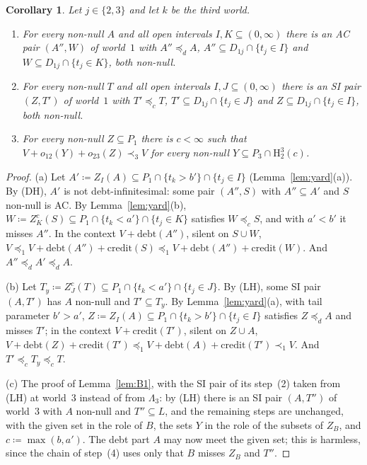 \documentclass[11pt]{article}
\newtheorem{corollary}[theorem]{Corollary}
\theoremstyle{definition}\newtheorem{definition}[theorem]{Definition}
\theoremstyle{remark}\newtheorem{remark}[theorem]{Remark}
\newcommand{\debt}{\mathrm{debt}}
\newcommand{\cred}{\mathrm{credit}}
\newcommand{\Hi}[3]{\mathrm H^{#1}_{#2}(#3)}
\begin{document}
\begin{corollary}\label{cor:LHcons}
Let $j\in\{2,3\}$ and let $k$ be the third world.
\begin{enumerate}[label=(\alph*)]
\item For every non-null $A$ and all open intervals $I,K\subseteq(0,\infty)$
there is an AC pair $(A'',W)$ of world~$1$ with $A''\preceq_dA$,
$A''\subseteq D_{1j}\cap\{t_j\in I\}$ and $W\subseteq D_{1j}\cap\{t_j\in K\}$,
both non-null.
\item For every non-null $T$ and all open intervals $I,J\subseteq(0,\infty)$
there is an SI pair $(Z,T')$ of world~$1$ with $T'\preceq_cT$,
$T'\subseteq D_{1j}\cap\{t_j\in J\}$ and $Z\subseteq D_{1j}\cap\{t_j\in I\}$,
both non-null.
\item For every non-null $Z\subseteq P_1$ there is $c<\infty$ such that
$V+o_{12}(Y)+o_{23}(Z)\prec_3V$ for every non-null $Y\subseteq P_3\cap
\Hi32c$.
\end{enumerate}
\end{corollary}
\begin{proof}
(a) Let $A'\coloneqq Z_I(A)\subseteq P_1\cap\{t_k>b'\}\cap\{t_j\in I\}$
(Lemma~\ref{lem:yard}(a)). By (DH), $A'$ is not debt-infinitesimal: some pair
$(A'',S)$ with $A''\subseteq A'$ and $S$ non-null is AC. By
Lemma~\ref{lem:yard}(b), $W\coloneqq Z^c_K(S)\subseteq P_1\cap\{t_k<a'\}
\cap\{t_j\in K\}$ satisfies $W\preceq_cS$, and with $a'<b'$ it misses $A''$.
In the context $V+\debt(A'')$, silent on $S\cup W$,
$V\preceq_1V+\debt(A'')+\cred(S)\preceq_1V+\debt(A'')+\cred(W)$. And
$A''\preceq_dA'\preceq_dA$.

(b) Let $T_y\coloneqq Z^c_J(T)\subseteq P_1\cap\{t_k<a'\}\cap\{t_j\in J\}$.
By (LH), some SI pair $(A,T')$ has $A$ non-null and $T'\subseteq T_y$. By
Lemma~\ref{lem:yard}(a), with tail parameter $b'>a'$, $Z\coloneqq Z_I(A)
\subseteq P_1\cap\{t_k>b'\}\cap\{t_j\in I\}$ satisfies $Z\preceq_dA$ and
misses $T'$; in the context $V+\cred(T')$, silent on $Z\cup A$,
$V+\debt(Z)+\cred(T')\preceq_1V+\debt(A)+\cred(T')\prec_1V$. And
$T'\preceq_cT_y\preceq_cT$.

(c) The proof of Lemma~\ref{lem:B1}, with the SI pair of its step~(2) taken
from (LH) at world~$3$ instead of from $\Lambda_3$: by (LH) there is an SI
pair $(A,T'')$ of world~$3$ with $A$ non-null and $T''\subseteq L$, and the
remaining steps are unchanged, with the given set in the role of $B$, the
sets $Y$ in the role of the subsets of $Z_B$, and $c\coloneqq\max(b,a')$. The
debt part $A$ may now meet the given set; this is harmless, since the chain
of step~(4) uses only that $B$ misses $Z_B$ and $T''$.
\end{proof}
\end{document}
